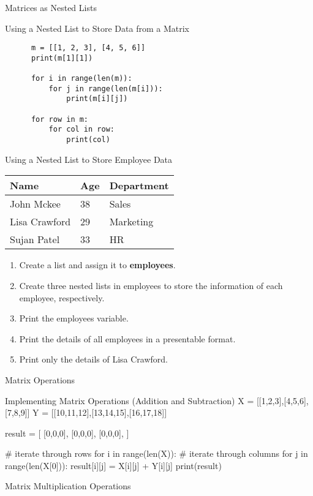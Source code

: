 \documentclass[../main.tex]{subfiles}
\begin{document}
\begin{frame}[fragile]{Matrices as Nested Lists}
  \begin{exercise}{Using a Nested List to Store Data from a Matrix}
    \begin{lstlisting}
      m = [[1, 2, 3], [4, 5, 6]]
      print(m[1][1])

      for i in range(len(m)):
          for j in range(len(m[i])):
              print(m[i][j])

      for row in m:
          for col in row:
              print(col)
    \end{lstlisting}
  \end{exercise}
\end{frame}
\begin{frameact}{Using a Nested List to Store Employee Data}

  {\centering
    \begin{tabular}{lll}
      \toprule
      Name          & Age & Department \\
      \midrule
      John Mckee    & 38  & Sales      \\
      Lisa Crawford & 29  & Marketing  \\
      Sujan Patel   & 33  & HR\\
      \bottomrule
    \end{tabular}
    \par}
  
  \begin{enumerate}
\item Create a list and assign it to \textbf{employees}.
\item Create three nested lists in employees to store the information of each employee, respectively.
\item Print the employees variable.
\item Print the details of all employees in a presentable format.
\item Print only the details of Lisa Crawford.
  \end{enumerate}
\end{frameact}

\begin{frame}[fragile]{Matrix Operations}
  \begin{exercise}{Implementing Matrix Operations (Addition and Subtraction)}
    X = [[1,2,3],[4,5,6],[7,8,9]]
    Y = [[10,11,12],[13,14,15],[16,17,18]]

    result = [
              [0,0,0],
              [0,0,0],
              [0,0,0],
              ]

    # iterate through rows
    for i in range(len(X)):
    # iterate through columns
        for j in range(len(X[0])):
        result[i][j] = X[i][j] + Y[i][j]
print(result)
  \end{exercise}
\end{frame}

\begin{frame}[fragile]{Matrix Multiplication Operations}
  
\end{frame}
\end{document}
